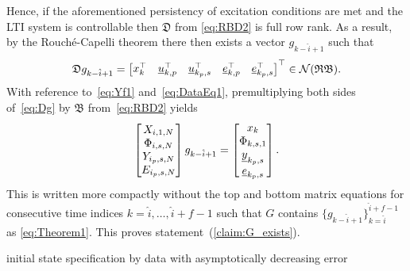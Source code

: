 Hence, if the aforementioned persistency of excitation conditions are met and the \ac{LTI} system is controllable then $\mathfrak{D}$ from \eqref{eq:RBD2} is full row rank. As a result, by the Rouch\'{e}-Capelli theorem there then exists a vector $g_{k-\hat{i}+1}$ such that
\begin{align}\label{eq:Dg}
    \mathfrak{D} g_{k-\hat{i}+1} =
    \begin{bmatrix}
        x_k^\top & \underline{u}_{k,p}^\top & \underline{u}_{k_p,s}^\top & \underline{e}_{k,p}^\top & \underline{e}_{k_p,s}^\top
    \end{bmatrix}^\top\in\mathcal{N}(\mathfrak{RB}).
\end{align}
With reference to~\eqref{eq:Yf1} and~\eqref{eq:DataEq1}, premultiplying both sides of~\eqref{eq:Dg} by $\mathfrak{B}$ from~\eqref{eq:RBD2} yields
\begin{align}\label{eq:Dg}
    \begin{bmatrix}
        X_{i,1,N}\\
        \Phi_{i,s,N}\\
        Y_{i_p,s,N}\\
        E_{i_p,s,N}
    \end{bmatrix}g_{k-\hat{i}+1}=
    \begin{bmatrix}
        x_k\\
        \Phi_{k,s,1}\\
        \underline{y}_{k_p,s}\\
        \underline{e}_{k_p,s}
    \end{bmatrix}.
\end{align}
This is written more compactly without the top and bottom matrix equations for consecutive time indices $k={\hat{i},\dots,\hat{i}+f-1}$ such that $G$ contains $\{g_{k-\hat{i}+1}\}_{k=\hat{i}}^{\hat{i}+f-1}$ as \eqref{eq:Theorem1}. This proves statement~(\ref{claim:G_exists}).

initial state specification by data with asymptotically decreasing error


